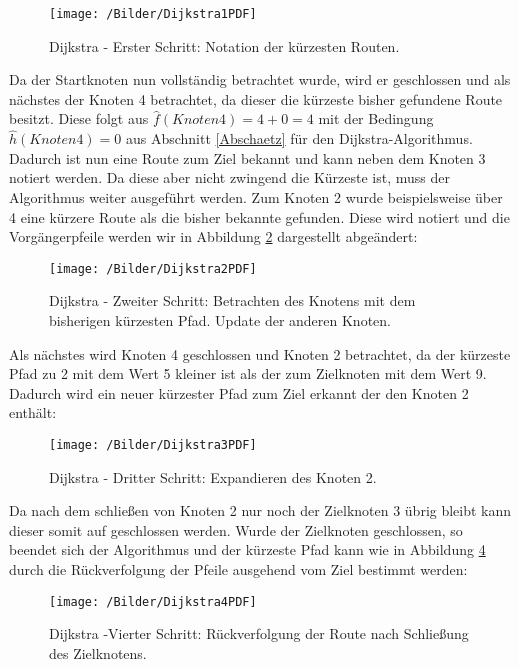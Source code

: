 		\begin{figure}[H]
			\centering
			\texttt{[image: /Bilder/Dijkstra1PDF]}
			\vspace{0.2cm}
			\caption{Dijkstra - Erster Schritt: Notation der kürzesten Routen. }\label{Dijkstra1}
		\end{figure}
		
		Da der Startknoten nun vollständig betrachtet wurde, wird er geschlossen und als nächstes der Knoten 4 betrachtet, da dieser die kürzeste bisher gefundene Route besitzt. Diese folgt aus $\hat{f}(Knoten 4)=4+0=4$ mit der Bedingung $\hat{h}(Knoten 4) = 0$ aus Abschnitt \ref{Abschaetz} für den Dijkstra-Algorithmus. Dadurch ist nun eine Route zum Ziel bekannt und kann neben dem Knoten 3 notiert werden. Da diese aber nicht zwingend die Kürzeste ist, muss der Algorithmus weiter ausgeführt werden. Zum Knoten 2 wurde beispielsweise über 4 eine kürzere Route als die bisher bekannte gefunden. Diese wird notiert und die Vorgängerpfeile werden wir in Abbildung \ref{Dijkstra2} dargestellt abgeändert:
		
		\begin{figure}[H]
			\centering
			\texttt{[image: /Bilder/Dijkstra2PDF]}
			\vspace{0.2cm}
			\caption{Dijkstra - Zweiter Schritt: Betrachten des Knotens mit dem bisherigen kürzesten Pfad. Update der anderen Knoten.}\label{Dijkstra2}
		\end{figure}
		
		Als nächstes wird Knoten 4 geschlossen und Knoten 2 betrachtet, da der kürzeste Pfad zu 2 mit dem Wert 5 kleiner ist als der zum Zielknoten mit dem Wert 9. Dadurch wird ein neuer kürzester Pfad zum Ziel erkannt der den Knoten 2 enthält:
		
		\begin{figure}[H]
			\centering
			\texttt{[image: /Bilder/Dijkstra3PDF]}
			\vspace{0.2cm}
			\caption{Dijkstra - Dritter Schritt: Expandieren des Knoten 2.}\label{Dijkstra3}
		\end{figure}
		
		Da nach dem schließen von Knoten 2 nur noch der Zielknoten 3 übrig bleibt kann dieser somit auf geschlossen werden. Wurde der Zielknoten geschlossen, so beendet sich der Algorithmus und der kürzeste Pfad kann wie in Abbildung \ref{Dijkstra4} durch die Rückverfolgung  der Pfeile ausgehend vom Ziel bestimmt werden:
		
		\begin{figure}[H]
			\centering
			\texttt{[image: /Bilder/Dijkstra4PDF]}
			\vspace{0.2cm}
			\caption{Dijkstra -Vierter Schritt: Rückverfolgung der Route nach Schließung des Zielknotens.}\label{Dijkstra4}
		\end{figure}
			
